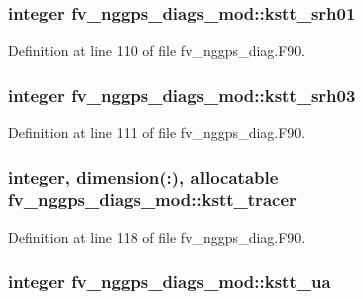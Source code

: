 \subsubsection[{kstt\-\_\-srh01}]{\setlength{\rightskip}{0pt plus 5cm}integer fv\-\_\-nggps\-\_\-diags\-\_\-mod\-::kstt\-\_\-srh01\hspace{0.3cm}{\ttfamily [private]}}\label{classfv__nggps__diags__mod_ad874bf572a0671a4b9ab899687ac92da}


Definition at line 110 of file fv\-\_\-nggps\-\_\-diag.\-F90.

\subsubsection[{kstt\-\_\-srh03}]{\setlength{\rightskip}{0pt plus 5cm}integer fv\-\_\-nggps\-\_\-diags\-\_\-mod\-::kstt\-\_\-srh03\hspace{0.3cm}{\ttfamily [private]}}\label{classfv__nggps__diags__mod_a69af7c0dbc3c41d121b40a331bf37bd3}


Definition at line 111 of file fv\-\_\-nggps\-\_\-diag.\-F90.

\subsubsection[{kstt\-\_\-tracer}]{\setlength{\rightskip}{0pt plus 5cm}integer, dimension(\-:), allocatable fv\-\_\-nggps\-\_\-diags\-\_\-mod\-::kstt\-\_\-tracer\hspace{0.3cm}{\ttfamily [private]}}\label{classfv__nggps__diags__mod_a7f1246aa235291e0baf4f056f7d05895}


Definition at line 118 of file fv\-\_\-nggps\-\_\-diag.\-F90.

\subsubsection[{kstt\-\_\-ua}]{\setlength{\rightskip}{0pt plus 5cm}integer fv\-\_\-nggps\-\_\-diags\-\_\-mod\-::kstt\-\_\-ua\hspace{0.3cm}{\ttfamily [private]}}\label{classfv__nggps__diags__mod_a841854dee23e174673acab69d5293ca5}


